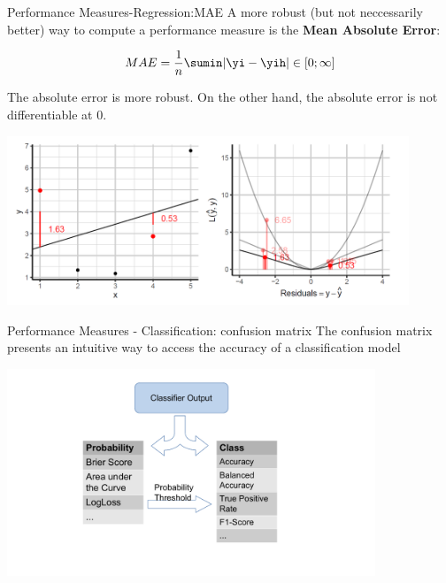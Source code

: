\begin{frame}{Performance Measures-Regression:MAE}
A more robust (but not neccessarily better) way to compute a performance
measure is the \textbf{Mean Absolute Error}:

\[
MAE = \frac{1}{n} \sumin |\yi - \yih| \in [0;\infty]
\]

The absolute error is more robust. On the other hand, the absolute error
is not differentiable at \(0\).

\scriptsize
\begin{center}
\includegraphics[width=0.9\textwidth]{plots/custom-loss.png}
\end{center}
\normalsize 
\end{frame}


\begin{frame}{Performance Measures - Classification: confusion matrix}
The confusion matrix presents an intuitive way to access the accuracy of a  classification model 
\newline
\begin{centering}
\includegraphics[width=11cm,page=3]{plots/confusion_matrix_measures.pdf}
\end{centering}
\end{frame}



